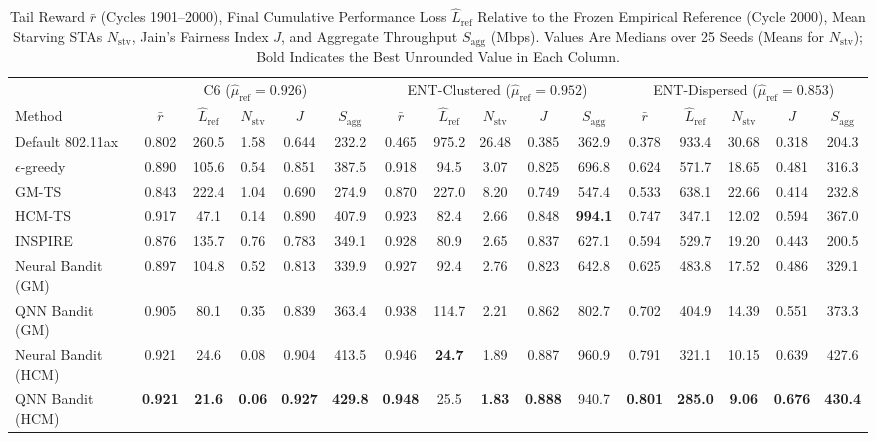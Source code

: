 \begin{table}[!t]
\centering
\caption{Tail Reward $\bar r$ (Cycles 1901--2000), Final Cumulative Performance Loss $\hat L_{\mathrm{ref}}$ Relative to the Frozen Empirical Reference (Cycle 2000), Mean Starving STAs $N_{\mathrm{stv}}$, Jain's Fairness Index $J$, and Aggregate Throughput $S_{\mathrm{agg}}$ (Mbps). Values Are Medians over 25 Seeds (Means for $N_{\mathrm{stv}}$); Bold Indicates the Best Unrounded Value in Each Column.}
\label{tab:final}
\small
\setlength{\tabcolsep}{3.5pt}
\begin{tabular}{l|ccccc|ccccc|ccccc}
\hline
& \multicolumn{5}{c|}{C6 ($\hat\mu_{\mathrm{ref}}=0.926$)} & \multicolumn{5}{c|}{ENT-Clustered ($\hat\mu_{\mathrm{ref}}=0.952$)} & \multicolumn{5}{c}{ENT-Dispersed ($\hat\mu_{\mathrm{ref}}=0.853$)} \\
Method & $\bar r$ & $\hat L_{\mathrm{ref}}$ & $N_{\mathrm{stv}}$ & $J$ & $S_{\mathrm{agg}}$ & $\bar r$ & $\hat L_{\mathrm{ref}}$ & $N_{\mathrm{stv}}$ & $J$ & $S_{\mathrm{agg}}$ & $\bar r$ & $\hat L_{\mathrm{ref}}$ & $N_{\mathrm{stv}}$ & $J$ & $S_{\mathrm{agg}}$ \\
\hline
Default 802.11ax & 0.802 & 260.5 & 1.58 & 0.644 & 232.2 & 0.465 & 975.2 & 26.48 & 0.385 & 362.9 & 0.378 & 933.4 & 30.68 & 0.318 & 204.3 \\
$\epsilon$-greedy & 0.890 & 105.6 & 0.54 & 0.851 & 387.5 & 0.918 & 94.5 & 3.07 & 0.825 & 696.8 & 0.624 & 571.7 & 18.65 & 0.481 & 316.3 \\
GM-TS \cite{bardou2021improving} & 0.843 & 222.4 & 1.04 & 0.690 & 274.9 & 0.870 & 227.0 & 8.20 & 0.749 & 547.4 & 0.533 & 638.1 & 22.66 & 0.414 & 232.8 \\
HCM-TS \cite{bardou2023mitigating} & 0.917 & 47.1 & 0.14 & 0.890 & 407.9 & 0.923 & 82.4 & 2.66 & 0.848 & \textbf{994.1} & 0.747 & 347.1 & 12.02 & 0.594 & 367.0 \\
INSPIRE \cite{bardou2022inspire} & 0.876 & 135.7 & 0.76 & 0.783 & 349.1 & 0.928 & 80.9 & 2.65 & 0.837 & 627.1 & 0.594 & 529.7 & 19.20 & 0.443 & 200.5 \\
\hline
Neural Bandit (GM) & 0.897 & 104.8 & 0.52 & 0.813 & 339.9 & 0.927 & 92.4 & 2.76 & 0.823 & 642.8 & 0.625 & 483.8 & 17.52 & 0.486 & 329.1 \\
QNN Bandit (GM) & 0.905 & 80.1 & 0.35 & 0.839 & 363.4 & 0.938 & 114.7 & 2.21 & 0.862 & 802.7 & 0.702 & 404.9 & 14.39 & 0.551 & 373.3 \\
Neural Bandit (HCM) & 0.921 & 24.6 & 0.08 & 0.904 & 413.5 & 0.946 & \textbf{24.7} & 1.89 & 0.887 & 960.9 & 0.791 & 321.1 & 10.15 & 0.639 & 427.6 \\
QNN Bandit (HCM) & \textbf{0.921} & \textbf{21.6} & \textbf{0.06} & \textbf{0.927} & \textbf{429.8} & \textbf{0.948} & 25.5 & \textbf{1.83} & \textbf{0.888} & 940.7 & \textbf{0.801} & \textbf{285.0} & \textbf{9.06} & \textbf{0.676} & \textbf{430.4} \\
\hline
\end{tabular}
\end{table}

